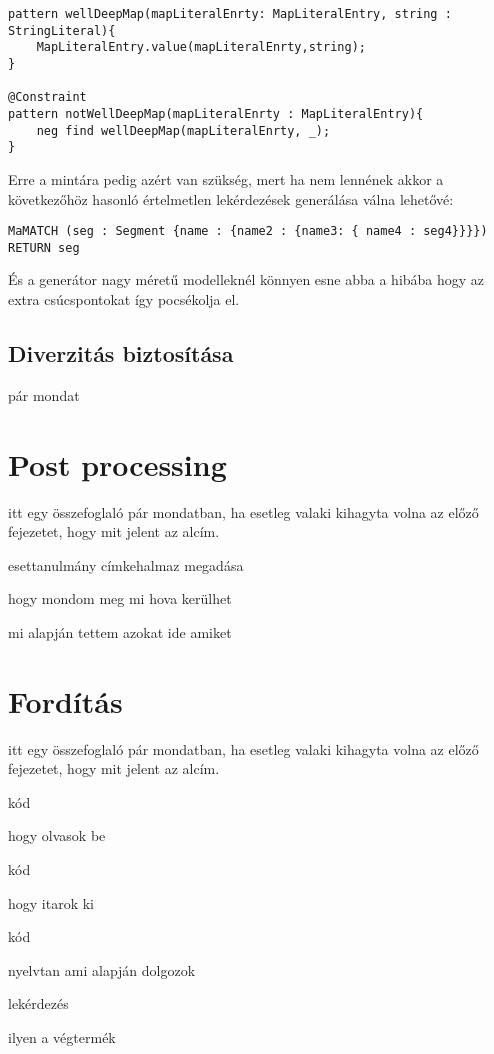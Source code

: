 \begin{lstlisting}[style=viatrasmall]
pattern wellDeepMap(mapLiteralEnrty: MapLiteralEntry, string : StringLiteral){
	MapLiteralEntry.value(mapLiteralEnrty,string);
}

@Constraint
pattern notWellDeepMap(mapLiteralEnrty : MapLiteralEntry){
	neg find wellDeepMap(mapLiteralEnrty, _);
}
\end{lstlisting}

Erre a mintára pedig azért van szükség, mert ha nem lennének akkor a következőhöz hasonló értelmetlen lekérdezések generálása válna lehetővé:

\begin{lstlisting}[style=cyphersmall]
MaMATCH (seg : Segment {name : {name2 : {name3: { name4 : seg4}}}}) 
RETURN seg
\end{lstlisting}

És a generátor nagy méretű modelleknél könnyen esne abba a hibába hogy az extra csúcspontokat így pocsékolja el.




\subsection{Diverzitás biztosítása}
pár mondat




\section{Post processing}
itt egy összefoglaló pár mondatban, ha esetleg valaki kihagyta volna az előző fejezetet, hogy mit jelent az alcím.

esettanulmány címkehalmaz megadása 

hogy mondom meg mi hova kerülhet

mi alapján tettem azokat ide amiket


\section{Fordítás}
itt egy összefoglaló pár mondatban, ha esetleg valaki kihagyta volna az előző fejezetet, hogy mit jelent az alcím.

kód

hogy olvasok be

kód

hogy itarok ki

kód

nyelvtan ami alapján dolgozok

lekérdezés

ilyen a végtermék

